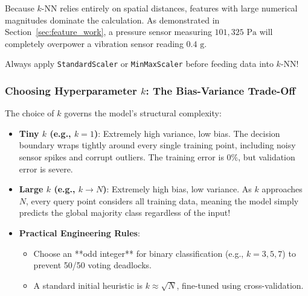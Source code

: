 \begin{warning}
Because $k$-NN relies entirely on spatial distances, features with large numerical magnitudes dominate the calculation. As demonstrated in Section~\ref{sec:feature_work}, a pressure sensor measuring $101{,}325\text{ Pa}$ will completely overpower a vibration sensor reading $0.4\text{ g}$. 

Always apply \texttt{StandardScaler} or \texttt{MinMaxScaler} before feeding data into $k$-NN!
\end{warning}

\subsubsection{Choosing Hyperparameter $k$: The Bias-Variance Trade-Off}
The choice of $k$ governs the model's structural complexity:
\begin{itemize}
    \item \textbf{Tiny $k$ (e.g., $k = 1$)}: Extremely high variance, low bias. The decision boundary wraps tightly around every single training point, including noisy sensor spikes and corrupt outliers. The training error is $0\%$, but validation error is severe.
    \item \textbf{Large $k$ (e.g., $k \to N$)}: Extremely high bias, low variance. As $k$ approaches $N$, every query point considers all training data, meaning the model simply predicts the global majority class regardless of the input!
    \item \textbf{Practical Engineering Rules}:
    \begin{itemize}
        \item Choose an **odd integer** for binary classification (e.g., $k = 3, 5, 7$) to prevent 50/50 voting deadlocks.
        \item A standard initial heuristic is $k \approx \sqrt{N}$, fine-tuned using cross-validation.
    \end{itemize}
\end{itemize}

